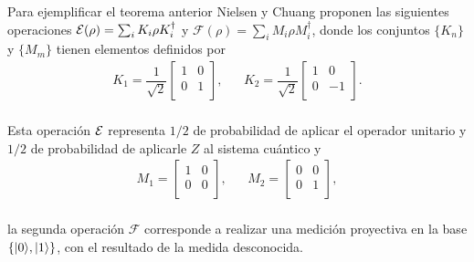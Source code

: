 Para ejemplificar el teorema anterior Nielsen y Chuang {\cite{nielsen_chuang_2010}} proponen las siguientes operaciones $\mathcal{E}(\rho)=\sum_i K_i\rho K_i^\dagger$ y $\mathcal{F}(\rho)=\sum_i M_i\rho M_i^\dagger$, donde los conjuntos $\{K_n\}$ y $\{M_m\}$ tienen elementos definidos por 
\begin{equation}
    \begin{array}{ccc}
        K_1=\dfrac{1}{\sqrt{2}}\begin{bmatrix}
            1&0\\
            0&1\\
        \end{bmatrix},&&K_2=\dfrac{1}{\sqrt{2}}\begin{bmatrix}
            1&0\\
            0&-1\\
        \end{bmatrix}.\\
    \end{array}
\end{equation}

Esta operación $\mathcal{E}$ representa $1/2$ de probabilidad de aplicar el operador unitario y $1/2$ de probabilidad de aplicarle $Z$ al sistema cuántico y
\begin{equation}
    \begin{array}{ccc}
        M_1=\begin{bmatrix}
            1&0\\
            0&0\\
        \end{bmatrix},&&M_2=\begin{bmatrix}
            0&0\\
            0&1\\
        \end{bmatrix},\\
    \end{array}
\end{equation}

la segunda operación $\mathcal{F}$ corresponde a realizar una medición proyectiva en la base $\{|0\rangle , |1\rangle\}$, con el resultado de la medida desconocida. 



